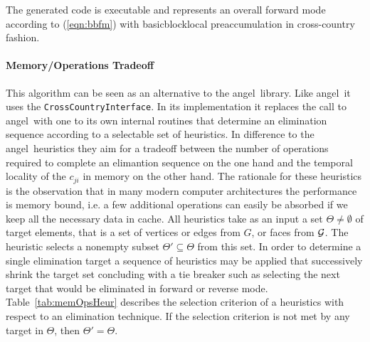 \documentclass[11pt]{article}
\newcommand{\angel}{angel}
\newcommand{\basicblock}{basicblock}
\newcommand{\code}[1]{{\small\tt{#1}}}
\newcommand{\reftab}[1]{{Table~\ref{#1}}}
\newcommand{\refeqn}[1]{{(\ref{#1})}}
\begin{document}
The generated code is executable and represents an overall forward mode 
according to \refeqn{eqn:bbfm} with \basicblock\-local preaccumulation in 
cross-country fashion. 

\paragraph{Memory/Operations Tradeoff}\label{sssec:MMTradeOff}

This algorithm can be seen as an alternative to the \angel\ library. 
Like \angel\ it uses the \code{CrossCountryInterface}. In its implementation 
it replaces the call to \angel\ with one to its own internal routines that
determine an elimination sequence according to a selectable set of heuristics. 
In difference to the \angel\ heuristics  they 
aim for a tradeoff between the number of operations required to complete an elimantion 
sequence on the one hand and the temporal locality of the $c_{ji}$ in memory on the other hand. 
The rationale for these heuristics is the observation that in many modern 
computer architectures the performance is memory bound, i.e. a few additional 
operations can easily be absorbed if we keep all the necessary data in cache. 
All heuristics take as an input a set $\Theta \neq \emptyset $ of target elements, that is 
a set of vertices or edges from $G$, or faces from $\cal G$. 
The heuristic selects a nonempty subset $\Theta'\subseteq \Theta $ from this set. 
In order to determine a single elimination target a sequence of heuristics may be applied 
that successively shrink the target set concluding with a tie breaker such as 
selecting the next target that would be eliminated in forward or reverse mode. 
\reftab{tab:memOpsHeur} describes the selection criterion of a heuristics with 
respect to an elimination technique.  If the selection criterion is not met 
by any target in $\Theta$, then $\Theta'=\Theta$. 
\end{document}
